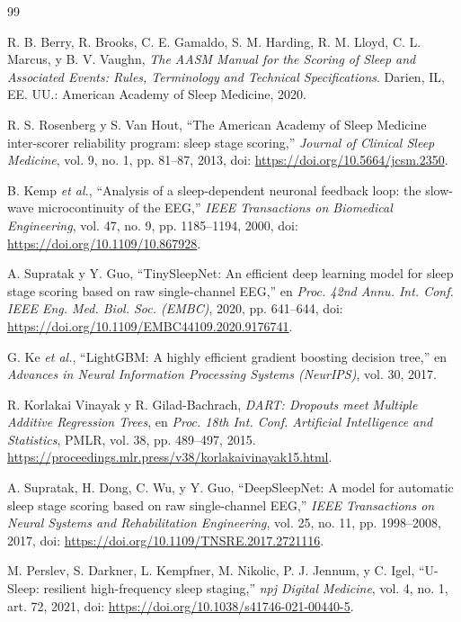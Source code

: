 \documentclass[conference]{IEEEtran}
\begin{document}
\renewcommand{\refname}{Referencias}
\begin{thebibliography}{99}

R. B. Berry, R. Brooks, C. E. Gamaldo, S. M. Harding, R. M. Lloyd, C. L. Marcus, y B. V. Vaughn, \textit{The AASM Manual for the Scoring of Sleep and Associated Events: Rules, Terminology and Technical Specifications}. Darien, IL, EE. UU.: American Academy of Sleep Medicine, 2020.

R. S. Rosenberg y S. Van Hout, ``The American Academy of Sleep Medicine inter-scorer reliability program: sleep stage scoring,'' \textit{Journal of Clinical Sleep Medicine}, vol. 9, no. 1, pp. 81--87, 2013, doi: \url{https://doi.org/10.5664/jcsm.2350}.

B. Kemp \textit{et al.}, ``Analysis of a sleep-dependent neuronal feedback loop: the slow-wave microcontinuity of the EEG,'' \textit{IEEE Transactions on Biomedical Engineering}, vol. 47, no. 9, pp. 1185--1194, 2000, doi: \url{https://doi.org/10.1109/10.867928}.

A. Supratak y Y. Guo, ``TinySleepNet: An efficient deep learning model for sleep stage scoring based on raw single-channel EEG,'' en \textit{Proc. 42nd Annu. Int. Conf. IEEE Eng. Med. Biol. Soc. (EMBC)}, 2020, pp. 641--644, doi: \url{https://doi.org/10.1109/EMBC44109.2020.9176741}.

G. Ke \textit{et al.}, ``LightGBM: A highly efficient gradient boosting decision tree,'' en \textit{Advances in Neural Information Processing Systems (NeurIPS)}, vol. 30, 2017.

R. Korlakai Vinayak y R. Gilad-Bachrach, \emph{DART: Dropouts meet Multiple Additive Regression Trees}, en \textit{Proc. 18th Int. Conf. Artificial Intelligence and Statistics}, PMLR, vol. 38, pp. 489--497, 2015. \url{https://proceedings.mlr.press/v38/korlakaivinayak15.html}.

A. Supratak, H. Dong, C. Wu, y Y. Guo, ``DeepSleepNet: A model for automatic sleep stage scoring based on raw single-channel EEG,'' \textit{IEEE Transactions on Neural Systems and Rehabilitation Engineering}, vol. 25, no. 11, pp. 1998--2008, 2017, doi: \url{https://doi.org/10.1109/TNSRE.2017.2721116}.

M. Perslev, S. Darkner, L. Kempfner, M. Nikolic, P. J. Jennum, y C. Igel, ``U-Sleep: resilient high-frequency sleep staging,'' \textit{npj Digital Medicine}, vol. 4, no. 1, art. 72, 2021, doi: \url{https://doi.org/10.1038/s41746-021-00440-5}.


\end{thebibliography}
\end{document}
